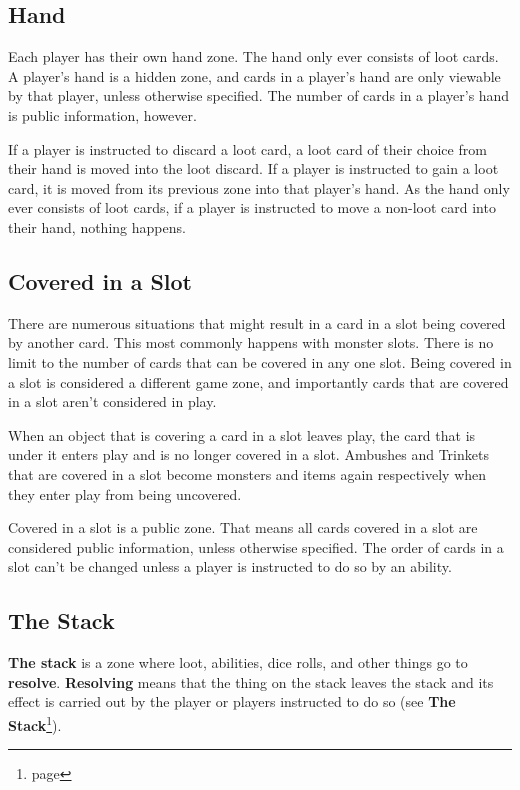 \documentclass[10pt, a4paper, twoside]{article} %
\begin{document}
    \subsection{Hand}
    Each player has their own hand zone. The hand only ever consists of loot cards. A player’s hand is a hidden zone, and cards in a player’s hand are only viewable by that player, unless otherwise specified. The number of cards in a player’s hand is public information, however.

    If a player is instructed to discard a loot card, a loot card of their choice from their hand is moved into the loot discard. If a player is instructed to gain a loot card, it is moved from its previous zone into that player’s hand. As the hand only ever consists of loot cards, if a player is instructed to move a non-loot card into their hand, nothing happens.

    \subsection{Covered in a Slot}
    There are numerous situations that might result in a card in a slot being covered by another card. This most commonly happens with monster slots. There is no limit to the number of cards that can be covered in any one slot. Being covered in a slot is considered a different game zone, and importantly cards that are covered in a slot aren’t considered in play.

    When an object that is covering a card in a slot leaves play, the card that is under it enters play and is no longer covered in a slot. Ambushes and Trinkets that are covered in a slot become monsters and items again respectively when they enter play from being uncovered.

    Covered in a slot is a public zone. That means all cards covered in a slot are considered public information, unless otherwise specified. The order of cards in a slot can’t be changed unless a player is instructed to do so by an ability.

    \subsection{The Stack}
    \textbf{The stack} is a zone where loot, abilities, dice rolls, and other things go to \textbf{resolve}. \textbf{Resolving} means that the thing on the stack leaves the stack and its effect is carried out by the player or players instructed to do so (see \textbf{The Stack}\footnote{page \pageref{stack}}).
\end{document}
